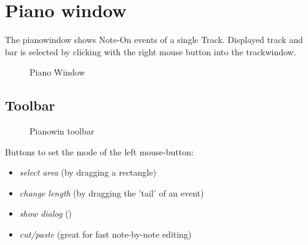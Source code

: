 \documentclass[letterpaper]{report}
\begin{document}

\chapter{Piano window}\label{pianowin}

The pianowindow shows Note-On events of a single Track.
Displayed track and bar is selected by clicking with the right
mouse button into the trackwindow.

\begin{figure}
\caption{Piano Window}
\end{figure}



\section{Toolbar}\label{pwtoolbar}

\begin{figure}
\caption{Pianowin toolbar}
\end{figure}

Buttons to set the mode of the left mouse-button:
\begin{itemize}
\item {\em select area} (by dragging a rectangle)
\item {\em change length} (by dragging the 'tail' of an event)
\item {\em show dialog} ()
\item {\em cut/paste} (great for fast note-by-note editing)
\end{itemize}
\end{document}
